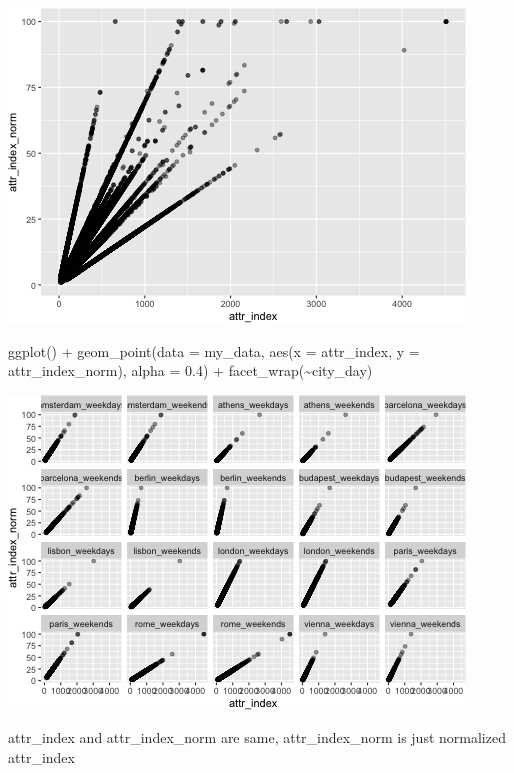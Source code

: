 \documentclass[
]{article}
\newenvironment{Shaded}{\begin{snugshade}}{\end{snugshade}}
\newcommand{\AttributeTok}[1]{\textcolor[rgb]{0.77,0.63,0.00}{#1}}
\newcommand{\FloatTok}[1]{\textcolor[rgb]{0.00,0.00,0.81}{#1}}
\newcommand{\FunctionTok}[1]{\textcolor[rgb]{0.00,0.00,0.00}{#1}}
\newcommand{\NormalTok}[1]{#1}
\newcommand{\SpecialCharTok}[1]{\textcolor[rgb]{0.00,0.00,0.00}{#1}}
\begin{document}
\includegraphics{Project_files/figure-latex/unnamed-chunk-8-1.png}

\begin{Shaded}
\begin{Highlighting}[]
\FunctionTok{ggplot}\NormalTok{() }\SpecialCharTok{+} \FunctionTok{geom\_point}\NormalTok{(}\AttributeTok{data =}\NormalTok{ my\_data, }\FunctionTok{aes}\NormalTok{(}\AttributeTok{x =}\NormalTok{ attr\_index, }\AttributeTok{y =}\NormalTok{ attr\_index\_norm),}
    \AttributeTok{alpha =} \FloatTok{0.4}\NormalTok{) }\SpecialCharTok{+} \FunctionTok{facet\_wrap}\NormalTok{(}\SpecialCharTok{\textasciitilde{}}\NormalTok{city\_day)}
\end{Highlighting}
\end{Shaded}

\includegraphics{Project_files/figure-latex/unnamed-chunk-8-2.png}

attr\_index and attr\_index\_norm are same, attr\_index\_norm is just
normalized attr\_index
\end{document}
